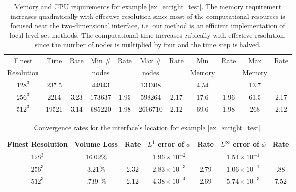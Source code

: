 \documentclass[english]{article}
\begin{document}
\begin{table}
\begin{center}\begin{tabular}{|c|c|c|c|c|c|c|c|c|c|c|}
  \hline
  Finest     &\multirow{2}{*}{Time}
             &\multirow{2}{*}{Rate}
             & Min \#
             &\multirow{2}{*}{Rate}
             & Max \#
             &\multirow{2}{*}{Rate}
             & Min
             &\multirow{2}{*}{Rate}
             & Max
             &\multirow{2}{*}{Rate}  \\
  Resolution & & & nodes & & nodes & & Memory & & Memory &  \\  \hline
  $128^3$ & 237.5 &  & 44943 &  & 133308 &  & 4.54 &  & 13.7 &  \\  \hline
  $256^3$ & 2214 & 3.23 & 173637 & 1.95 & 598264 & 2.17 & 17.6 & 1.96 & 61.5 & 2.17 \\  \hline
  $512^3$ & 19521 & 3.14 & 685220 & 1.98 & 2606710 & 2.12 & 69.6 & 1.98 & 268 & 2.12 \\  \hline

  \end{tabular}\caption{Memory and CPU requirements for example \ref{ex_enright_test}. The memory
requirement increases quadratically with effective resolution since most of the computational
resources is focused near the two-dimensional interface, i.e. our method is an efficient
implementation of local level set methods. The computational time increases cubically with
effective resolution, since the number of nodes is multiplied by four and the time step is halved.}
  \label{Enright_Table1}
  \end{center}  \end{table}


\begin{table}
\begin{center}
\begin{tabular}{|c|c|c|c|c|c|c|}
  \hline
  Finest Resolution & Volume Loss & Rate & $L^1     $ error of $\phi$ & Rate
                                         & $L^\infty$ error of $\phi$ & Rate \\\hline
  $128^3$ & 16.02\% &  & $1.96 \times 10^{-2}$ &  & $1.54 \times 10^{-1}$&\\\hline
  $256^3$ & 3.21\% & 2.32 & $2.83 \times 10^{-3}$ & 2.79 & $1.06 \times 10^{-1}$& .88\\\hline
  $512^3$ & .739 \% & 2.12 & $4.38 \times 10^{-4}$ & 2.69 & $5.74 \times 10^{-3}$& 7.52\\\hline
\end{tabular}\caption{Convergence rates for the interface's location for example \ref{ex_enright_test}.}
\label{Enright_Table2}
\end{center}\end{table}
\end{document}

